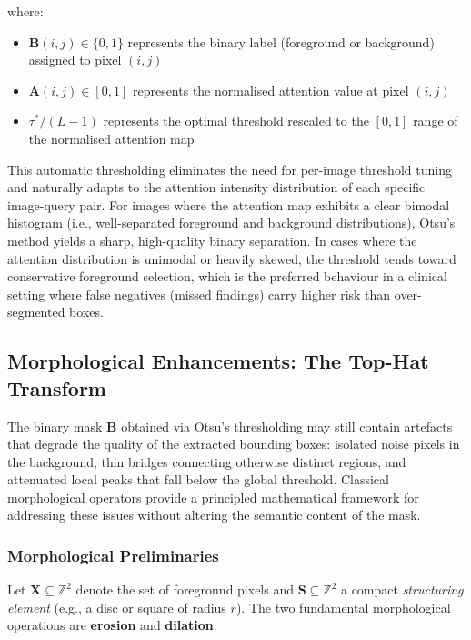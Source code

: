 where:
\begin{itemize}
\item $\mathbf{B}(i,j) \in \{0,1\}$ represents the binary label (foreground or background) assigned to pixel $(i,j)$
\item $\mathbf{A}(i,j) \in [0,1]$ represents the normalised attention value at pixel $(i,j)$
\item $\tau^{*}/(L-1)$ represents the optimal threshold rescaled to the $[0,1]$ range of the normalised attention map
\end{itemize}

This automatic thresholding eliminates the need for per-image threshold tuning and naturally adapts to the attention intensity distribution of each specific image-query pair. For images where the attention map exhibits a clear bimodal histogram (i.e., well-separated foreground and background distributions), Otsu's method yields a sharp, high-quality binary separation. In cases where the attention distribution is unimodal or heavily skewed, the threshold tends toward conservative foreground selection, which is the preferred behaviour in a clinical setting where false negatives (missed findings) carry higher risk than over-segmented boxes.


\subsection{Morphological Enhancements: The Top-Hat Transform}
\label{sec:3_4_2}

The binary mask $\mathbf{B}$ obtained via Otsu's thresholding may still contain artefacts that degrade the quality of the extracted bounding boxes: isolated noise pixels in the background, thin bridges connecting otherwise distinct regions, and attenuated local peaks that fall below the global threshold. Classical morphological operators provide a principled mathematical framework for addressing these issues without altering the semantic content of the mask.

\subsubsection{Morphological Preliminaries}

Let $\mathbf{X} \subseteq \mathbb{Z}^2$ denote the set of foreground pixels and $\mathbf{S} \subseteq \mathbb{Z}^2$ a compact \textit{structuring element} (e.g., a disc or square of radius $r$). The two fundamental morphological operations are \textbf{erosion} and \textbf{dilation}:

